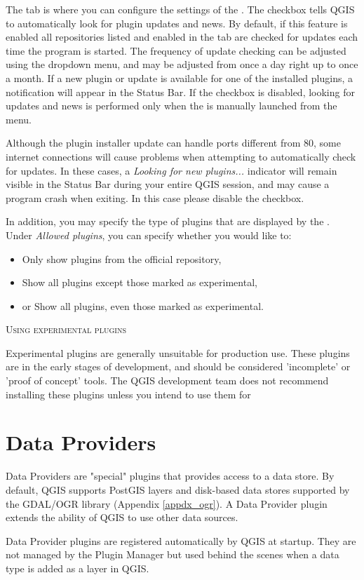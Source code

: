 
The  tab is where you can configure the settings of the . The  checkbox tells QGIS to automatically look for plugin updates and news. By default, if this feature is enabled all repositories listed and enabled in the  tab are checked for updates each time the program is started. The frequency of update checking can be adjusted using the dropdown menu, and may be adjusted from once a day right up to once a month. If a new plugin or update is available for one of the installed plugins, a notification will appear in the Status Bar. If the checkbox is disabled, looking for updates and news is performed only when the  is manually launched from the menu.

Although the plugin installer update can handle ports different from 80, some internet 
connections will cause problems when attempting to automatically check for updates. 
In these cases, a \textit{Looking for new plugins...} indicator will 
remain visible in the Status Bar during your entire QGIS session, and may cause a 
program crash when exiting. In this case please disable the checkbox.

In addition, you may specify the type of plugins that are displayed by the . Under \textit{Allowed plugins}, you can specify whether you would like to:

\begin{itemize}[label=--]
\item Only show plugins from the official repository,
\item Show all plugins except those marked as experimental,
\item or Show all plugins, even those marked as experimental.
\end{itemize}

\begin{Tip}
 \caption{\textsc{Using experimental plugins}}
Experimental plugins are generally unsuitable for production use. These plugins are in the early stages of development, and should be considered 'incomplete' or 'proof of concept' tools. The QGIS development team does not recommend installing these plugins unless you intend to use them for 
\end{Tip}

\section{Data Providers}

Data Providers are "special" plugins that provides access to a data store.
By default, QGIS supports PostGIS layers and disk-based data stores supported by the GDAL/OGR library (Appendix \ref{appdx_ogr}).
A Data Provider plugin extends the ability of QGIS to use other data sources.

Data Provider plugins are registered automatically by QGIS at startup.
They are not managed by the Plugin Manager but used behind the scenes when a data type is added as a layer in QGIS.

\FloatBarrier
